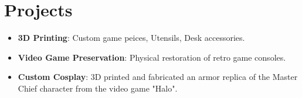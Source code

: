 \documentclass[letterpaper,12pt]{article}
\newcommand{\resumeItem}[2]{
  \item\small{
    \textbf{#1}{: #2 \vspace{-2pt}}
  }
}
\newcommand{\resumeSubItem}[2]{\resumeItem{#1}{#2}\vspace{-4pt}}
\newcommand{\resumeSubHeadingListStart}{\begin{itemize}[leftmargin=*]}
\newcommand{\resumeSubHeadingListEnd}{\end{itemize}}
\begin{document}
\section{Projects}
  	\resumeSubHeadingListStart
    	\resumeSubItem{3D Printing}{Custom game peices, Utensils, Desk accessories.} 
   		\resumeSubItem{Video Game Preservation}{Physical restoration of retro game consoles.}
    	\resumeSubItem{Custom Cosplay}{3D printed and fabricated an armor replica of the Master Chief character from the video game "Halo".} 
  	\resumeSubHeadingListEnd

\end{document}
